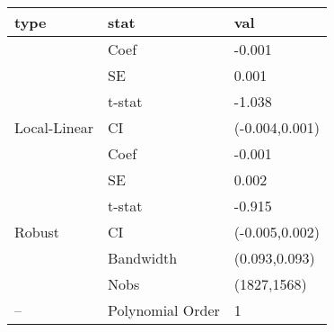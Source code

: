 
\begin{tabular}{lll}
\toprule
type & stat & val\\
\midrule
 & Coef & -0.001\\

 & SE & 0.001\\

 & t-stat & -1.038\\

\multirow{-4}{*}{\raggedright\arraybackslash Local-Linear} & CI & (-0.004,0.001)\\
\cmidrule{1-3}
 & Coef & -0.001\\

 & SE & 0.002\\

 & t-stat & -0.915\\

\multirow{-4}{*}{\raggedright\arraybackslash Robust} & CI & (-0.005,0.002)\\
\cmidrule{1-3}
 & Bandwidth & (0.093,0.093)\\

 & Nobs & (1827,1568)\\

\multirow{-3}{*}{\raggedright\arraybackslash --} & Polynomial Order & 1\\
\bottomrule
\end{tabular}